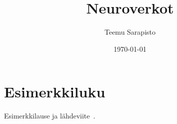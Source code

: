 \documentclass[finnish]{tktltiki2}
\title{Neuroverkot}
\author{Teemu Sarapisto}
\date{\today}
\theoremstyle{definition}
\theoremstyle{remark}
\begin{document}

  \frontmatter      %

  \maketitle        %
  \makeabstract     %

  \tableofcontents  %


  \mainmatter       %

  \section{Esimerkkiluku}


  Esimerkkilause ja lähdeviite~\cite{esimerkki}.



  
  





  
\end{document}
